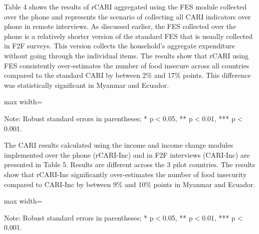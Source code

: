 \documentclass[11pt,harvard]{article}
\begin{document}
Table 4 shows the results of rCARI aggregated using the FES module collected over the phone and represents the scenario of collecting all CARI indicators over phone in remote interviews. As discussed earlier, the FES collected over the phone is a relatively shorter version of the standard FES that is usually collected in F2F surveys. This version collects the household's aggregate expenditure without going through the individual items. The results show that rCARI using FES consistently over-estimates the number of food insecure across all countries compared to the standard CARI by between 2\% and 17\% points. This difference was statistically significant in Myanmar and Ecuador.


\begin{table}[htbp]
	\centering
	\begin{adjustbox}{max width=\textwidth}
		\begin{threeparttable}
			\caption{Impact of Survey Modality: CARI-FES vs. rCARI-FES}
			\scriptsize
			 
			\label{tab:CARI_FES_rCARI_Modality_All_Country}
			\begin{tablenotes}
				\item Note: Robust standard errors in parentheses; * p$<$0.05, ** p$<$0.01, *** p$<$0.001. 
			\end{tablenotes}
		\end{threeparttable}
	\end{adjustbox}
\end{table}

The CARI results calculated using the income and income change modules implemented over the phone (rCARI-Inc) and in F2F interviews (CARI-Inc) are presented in Table 5. Results are different across the 3 pilot countries. The results show that rCARI-Inc significantly over-estimates the number of food insecurity compared to CARI-Inc by between 9\% and 10\% points in Myanmar and Ecuador. 


\begin{table}[htbp]
	\centering
	\begin{adjustbox}{max width=\textwidth}
		\begin{threeparttable}
			\caption{Impact of Survey Modality: CARI-Inc vs. rCARI-Inc}
			\scriptsize
			 
			\label{tab:Inc_CARI_rCARI_Modality_All_Country}
			\begin{tablenotes}
				\item Note: Robust standard errors in parentheses; * p$<$0.05, ** p$<$0.01, *** p$<$0.001. 
			\end{tablenotes}
		\end{threeparttable}
	\end{adjustbox}
\end{table}
\end{document}
